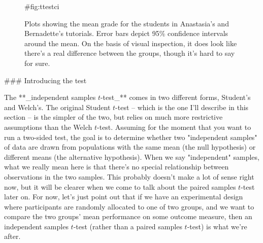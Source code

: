 \begin{figure}[t]
\begin{center}
\caption{Plots showing the mean grade for the students in Anastasia's and Bernadette's tutorials. Error bars depict 95\% confidence intervals around the mean. On the basis of visual inspection, it does look like there's a real difference between the groups, though it's hard to say for sure.}
\HR
{#fig:ttestci}
\end{center}
\end{figure}




### Introducing the test

The **_independent samples $t$-test_** comes in two different forms, Student's and Welch's. The original Student $t$-test -- which is the one I'll describe in this section -- is the simpler of the two, but relies on much more restrictive assumptions than the Welch $t$-test. Assuming for the moment that you want to run a two-sided test, the goal is to determine whether two "independent samples" of data are drawn from populations with the same mean (the null hypothesis) or different means (the alternative hypothesis). When we say "independent" samples, what we really mean here is that there's no special relationship between observations in the two samples. This probably doesn't make a lot of sense right now, but it will be clearer when we come to talk about the paired samples $t$-test later on. For now, let's just point out that if we have an experimental design where participants are randomly allocated to one of two groups, and we want to compare the two groups' mean performance on some outcome measure, then an independent samples $t$-test (rather than a paired samples $t$-test) is what we're after.

